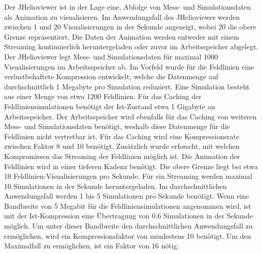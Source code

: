 Der JHelioviewer ist in der Lage eine, Abfolge von Mess- und Simulationsdaten als Animation zu visualisieren. Im Anwendungsfall des JHelioviewer werden zwischen 1 und 20 Visualisierungen in der Sekunde angezeigt, wobei 20 die obere Grenze repräsentiert. Die Daten der Animation werden entweder mit einem Streaming kontinuierlich heruntergeladen oder zuvor im Arbeitsspeicher abgelegt. Der JHelioviewer legt Mess- und Simulationsdaten für maximal 1000 Visualisierungen im Arbeitsspeicher ab. Im Vorfeld wurde für die Feldlinien eine verlustbehaftete Kompression entwickelt, welche die Datenmenge auf durchschnittlich 1 Megabyte pro Simulation reduziert. Eine Simulation besteht aus einer Menge von etwa 1200 Feldlinien. Für das Caching der Feldliniensimulationen benötigt der Ist-Zustand etwa 1 Gigabyte an Arbeitsspeicher. Der Arbeitsspeicher wird ebenfalls für das Caching von weiteren Mess- und Simulationsdaten benötigt, weshalb diese Datenmenge für die Feldlinien nicht vertretbar ist. Für das Caching wird eine Kompressionsrate zwischen Faktor 8 und 10 benötigt. Zusätzlich wurde erforscht, mit welchen Kompromissen das Streaming der Feldlinien möglich ist. Die Animation der Feldlinien wird in einer tieferen Kadenz benötigt. Die obere Grenze liegt bei etwa 10 Feldlinien-Visualisierungen pro Sekunde. Für ein Streaming werden maximal 10 Simulationen in der Sekunde heruntergeladen. Im durchschnittlichen Anwendungsfall werden 1 bis 5 Simulationen pro Sekunde benötigt. Wenn eine Bandbreite von 5 Megabit für die Feldliniensimulationen angenommen wird, ist mit der Ist-Kompression eine Übertragung von 0.6 Simulationen in der Sekunde möglich. Um unter dieser Bandbreite den durchschnittlichen Anwendungsfall zu ermöglichen, wird ein Kompressionsfaktor von mindestens 10 benötigt. Um den Maximalfall zu ermöglichen, ist ein Faktor von 16 nötig.

